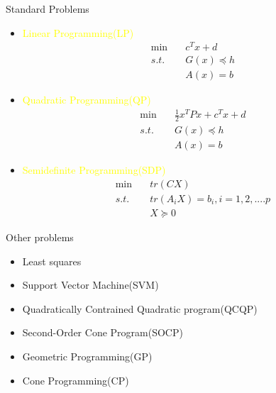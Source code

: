     \begin{frame}{Standard Problems}
      \vspace{-2pt}
      \begin{itemize}
        \item \textcolor{yellow}{Linear Programming(LP)}
        \[
        \begin{aligned}
        \min &\quad c^Tx+d \\
        s.t. &\quad G(x) \preceq h \\
            &\quad A(x) = b
        \end{aligned}
        \]
        \item \textcolor{yellow}{Quadratic Programming(QP)}
        \[
        \begin{aligned}
        \min &\quad \frac{1}{2}x^TPx+c^Tx+d \\
        s.t. &\quad G(x) \preceq h \\
             &\quad A(x) = b
        \end{aligned}
        \]
        \item \textcolor{yellow}{Semidefinite Programming(SDP)}
        \[
        \begin{aligned}
        \min &\quad tr(CX) \\
        s.t. &\quad tr(A_iX)=b_i, i=1,2,....p \\
             &\quad X \succeq 0
        \end{aligned}
        \]
      \end{itemize}
    \end{frame}

    \begin{frame}{Other problems}
      \Large
      \begin{itemize}
        \item Least squares
        \item Support Vector Machine(SVM)
        \item Quadratically Contrained Quadratic program(QCQP)
        \item Second-Order Cone Program(SOCP)
        \item Geometric Programming(GP)
        \item Cone Programming(CP)
      \end{itemize}
    \end{frame}

